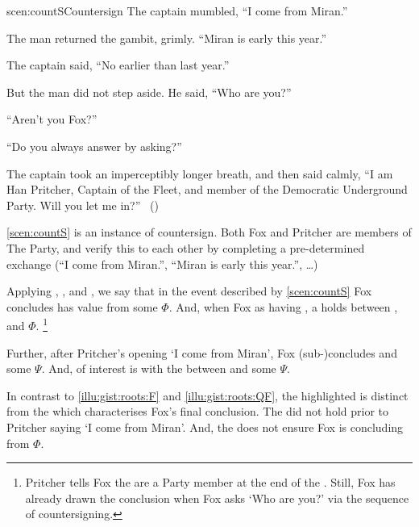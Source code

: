 \begin{note}
  \begin{rscenario}{scen:countS}{Countersign}%
    \indent The captain mumbled, ``I come from Miran.''

    The man returned the gambit, grimly.
    ``Miran is early this year.''

    The captain said, ``No earlier than last year.''

    But the man did not step aside.
    He said, ``Who are you?''

    ``Aren't you Fox?''

    ``Do you always answer by asking?''

    The captain took an imperceptibly longer breath, and then said calmly,
    ``I am Han Pritcher, Captain of the Fleet, and member of the Democratic Underground Party.
    Will you let me in?''%
    \mbox{ }\hfill\mbox{(\cite[70]{Asimov:1945aa})}%
    \newline
  \end{rscenario}

  \noindent%
  \autoref{scen:countS} is an instance of countersign.
  Both Fox and Pritcher are members of The Party, and verify this to each other by completing a pre-determined exchange (``I come from Miran.'', ``Miran is early this year.'', \dots)

  \noindent%
  Applying , , and , we say that in the event described by \autoref{scen:countS} Fox concludes \propI{\signConA{}} has value  from some \pool{} \(\Phi\).
  And, when Fox \evals{} \propI{\signConA{}} as having , a \ros{} holds between , and \(\Phi\).%
  \footnote{
    Pritcher tells Fox the are a Party member at the end of the \scen{}.
    Still, Fox has already drawn the conclusion when Fox asks `Who are you?' via the sequence of countersigning.
  }

  Further, after Pritcher's opening `I come from Miran', Fox (sub-)concludes  and some \pool{} \(\Psi\).
  And, of interest is with the \ros{} between  and some \pool{} \(\Psi\).

  In contrast to  \ref{illu:gist:roots:F} and \ref{illu:gist:roots:QF}, the highlighted \ros{} is distinct from the \ros{} which characterises Fox's final conclusion.
  The \ros{} did not hold prior to Pritcher saying `I come from Miran'.
  And, the \ros{} does not ensure Fox is concluding  from \(\Phi\).


\end{note}
